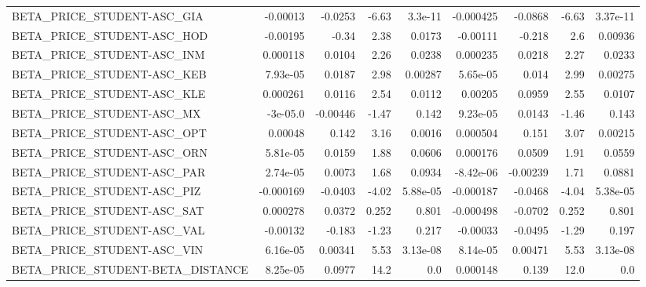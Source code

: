 \begin{tabular}{lrrrrrrrr}
BETA\_PRICE\_STUDENT-ASC\_GIA             &    -0.00013 &      -0.0253 &   -6.63 &  3.3e-11 &  -0.000425 &     -0.0868 &        -6.63 &      3.37e-11 \\
BETA\_PRICE\_STUDENT-ASC\_HOD             &    -0.00195 &        -0.34 &    2.38 &   0.0173 &   -0.00111 &      -0.218 &          2.6 &       0.00936 \\
BETA\_PRICE\_STUDENT-ASC\_INM             &    0.000118 &       0.0104 &    2.26 &   0.0238 &   0.000235 &      0.0218 &         2.27 &        0.0233 \\
BETA\_PRICE\_STUDENT-ASC\_KEB             &    7.93e-05 &       0.0187 &    2.98 &  0.00287 &   5.65e-05 &       0.014 &         2.99 &       0.00275 \\
BETA\_PRICE\_STUDENT-ASC\_KLE             &    0.000261 &       0.0116 &    2.54 &   0.0112 &    0.00205 &      0.0959 &         2.55 &        0.0107 \\
BETA\_PRICE\_STUDENT-ASC\_MX              &    -3e-05.0 &     -0.00446 &   -1.47 &    0.142 &   9.23e-05 &      0.0143 &        -1.46 &         0.143 \\
BETA\_PRICE\_STUDENT-ASC\_OPT             &     0.00048 &        0.142 &    3.16 &   0.0016 &   0.000504 &       0.151 &         3.07 &       0.00215 \\
BETA\_PRICE\_STUDENT-ASC\_ORN             &    5.81e-05 &       0.0159 &    1.88 &   0.0606 &   0.000176 &      0.0509 &         1.91 &        0.0559 \\
BETA\_PRICE\_STUDENT-ASC\_PAR             &    2.74e-05 &       0.0073 &    1.68 &   0.0934 &  -8.42e-06 &    -0.00239 &         1.71 &        0.0881 \\
BETA\_PRICE\_STUDENT-ASC\_PIZ             &   -0.000169 &      -0.0403 &   -4.02 & 5.88e-05 &  -0.000187 &     -0.0468 &        -4.04 &      5.38e-05 \\
BETA\_PRICE\_STUDENT-ASC\_SAT             &    0.000278 &       0.0372 &   0.252 &    0.801 &  -0.000498 &     -0.0702 &        0.252 &         0.801 \\
BETA\_PRICE\_STUDENT-ASC\_VAL             &    -0.00132 &       -0.183 &   -1.23 &    0.217 &   -0.00033 &     -0.0495 &        -1.29 &         0.197 \\
BETA\_PRICE\_STUDENT-ASC\_VIN             &    6.16e-05 &      0.00341 &    5.53 & 3.13e-08 &   8.14e-05 &     0.00471 &         5.53 &      3.13e-08 \\
BETA\_PRICE\_STUDENT-BETA\_DISTANCE       &    8.25e-05 &       0.0977 &    14.2 &      0.0 &   0.000148 &       0.139 &         12.0 &           0.0 \\

\end{tabular}
